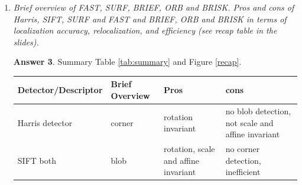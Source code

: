 \documentclass[a4paper,12 pt]{article}
\theoremstyle{definition}
\theoremstyle{remark}
\theoremstyle{definition}
\theoremstyle{definition}
\theoremstyle{definition}
\theoremstyle{definition}
\theoremstyle{remark}
\theoremstyle{remark}
\theoremstyle{definition}
\theoremstyle{definition}
\newtheorem*{answer}{Answer}
\begin{document}
\begin{enumerate}
\begin{enumerate}
\begin{answer}
\begin{equation}
\frac{d(f_1)}{d(f_2)}<\text{Threshold (usually 0.8)},
\end{equation}
where
\begin{equation}
\begin{split}
d(f_1) &\text{ is the distance of the closest neighbor}\\
d(f_2) &\text{ is the distance of the second closest neighbor}
\end{split}
\end{equation}
Correct matches need to have the closest neighbor significantly closer than the closest incorrect match, to achieve reliable matching. Moreover, for \textbf{false matches}, there will likely be a number of other false matches within similar distances due to the high dimensionality of the feature space. (aka \textbf{curse of dimensionality}). We can think of the second closest match as providing an estimate of the density of false matches within this portion of the feature space, and at the same time identifying specific instances of feature ambiguity.
\end{answer}
\item \textit{Where does the 0.8 threshold come from?}
\begin{answer}
\
\begin{itemize}
\item Eliminates 90\% of the false matches,
\item Discards less than 5\% of the correct matches.
\end{itemize}
\end{answer}
\end{enumerate}
\item \textit{Brief overview of FAST, SURF, BRIEF, ORB and BRISK. Pros and cons of Harris, SIFT, SURF and FAST and BRIEF, ORB and BRISK in terms of localization accuracy, relocalization, and efficiency (see recap table in the slides).}
\begin{answer}
Summary Table \ref{tab:summary} and Figure \ref{recap}.\\
\begin{table}[h!]
\tiny
\begin{tabular}{l | p{7cm} p{3cm}  p{3cm} }
	\hline
	Detector/Descriptor & Brief Overview & Pros & cons\\
	\hline
	Harris detector& corner & rotation invariant & no blob detection, not scale and affine invariant\\
	SIFT both&  blob &rotation, scale and affine invariant & no corner detection, inefficient\\

\end{tabular}
\end{table}
\end{answer}
\end{enumerate}
\end{document}
